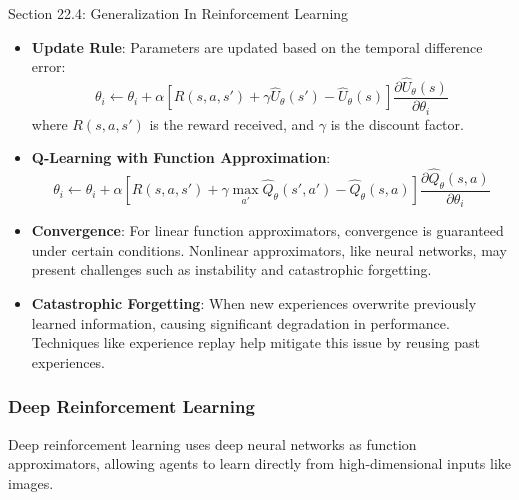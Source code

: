 \begin{notes}{Section 22.4: Generalization In Reinforcement Learning}
\begin{highlight}
        \begin{itemize}
            \item \textbf{Update Rule}: Parameters are updated based on the temporal difference error:
            \[
            \theta_i \leftarrow \theta_i + \alpha [R(s, a, s') + \gamma \hat{U}_\theta(s') - \hat{U}_\theta(s)] \frac{\partial \hat{U}_\theta(s)}{\partial \theta_i}
            \]
            where $R(s, a, s')$ is the reward received, and $\gamma$ is the discount factor.
            \item \textbf{Q-Learning with Function Approximation}:
            \[
            \theta_i \leftarrow \theta_i + \alpha [R(s, a, s') + \gamma \max_{a'} \hat{Q}_\theta(s', a') - \hat{Q}_\theta(s, a)] \frac{\partial \hat{Q}_\theta(s, a)}{\partial \theta_i}
            \]
            \item \textbf{Convergence}: For linear function approximators, convergence is guaranteed under certain conditions. Nonlinear approximators, like neural networks, may present challenges 
            such as instability and catastrophic forgetting.
            \item \textbf{Catastrophic Forgetting}: When new experiences overwrite previously learned information, causing significant degradation in performance. Techniques like experience replay 
            help mitigate this issue by reusing past experiences.
        \end{itemize}
    
    \end{highlight}
    
    \subsubsection*{Deep Reinforcement Learning}
    
    Deep reinforcement learning uses deep neural networks as function approximators, allowing agents to learn directly from high-dimensional inputs like images.
    
    \begin{highlight}
    

\end{highlight}
\end{notes}
